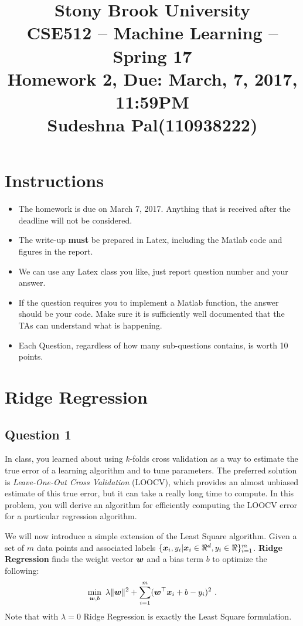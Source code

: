 \documentclass{article}
\title{\bf Stony Brook University \\ CSE512 -- Machine Learning -- Spring 17 \\  
Homework 2, Due: March, 7, 2017, 11:59PM \\ Sudeshna Pal(110938222)}
\date{\vspace{-1cm}}
\begin{document}
\maketitle

\section*{Instructions}
\begin{itemize}
\item The homework is due on March 7, 2017. Anything that is received after the deadline will not be considered.
\item The write-up \textbf{must} be prepared in Latex, including the Matlab code and figures in the report.
\item We can use any Latex class you like, just report question number and your answer.
\item If the question requires you to implement a Matlab function, the answer should be your code. Make sure it is sufficiently well documented that the TAs can understand what is happening.
\item Each Question, regardless of how many sub-questions contains, is worth 10 points.
\end{itemize}

\section{Ridge Regression}
\subsection{Question 1}

In class, you learned about using $k$-folds cross validation as a way to estimate the true error of a learning algorithm and to tune parameters. The preferred solution is \emph{Leave-One-Out Cross Validation} (LOOCV), which provides an almost unbiased estimate of this true error, but it can take a really long time to compute. In this problem, you will derive an algorithm for efficiently computing the LOOCV error for a particular regression algorithm.

We will now introduce a simple extension of the Least Square algorithm.
Given a set of $m$ data points and associated labels $\{\boldsymbol{x}_i, y_i | \boldsymbol{x}_i \in \Re^d, y_i \in \Re \}_{i=1}^{m}$. \textbf{Ridge Regression} finds the weight vector $\boldsymbol{w}$ and a bias term $b$ to optimize the following:
\begin{align}
 \label{eq:rr}
\min_{\boldsymbol{w}, b} \ \lambda \|\boldsymbol{w}\|^2 + \sum_{i=1}^{m} (\boldsymbol{w}^\top\boldsymbol{x}_i + b - y_i)^2~.
\end{align}
Note that with $\lambda=0$ Ridge Regression is exactly the Least Square formulation.
\end{document}
